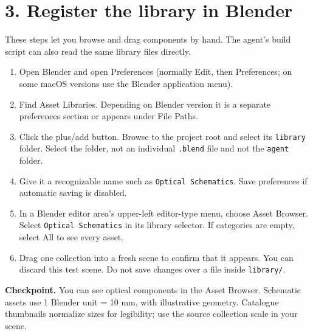\documentclass[11pt,a4paper]{article}
\begin{document}
\section*{3. Register the library in Blender}
These steps let you browse and drag components by hand. The agent's build script can also read the same library files directly.
\begin{enumerate}
\item Open Blender and open Preferences (normally Edit, then Preferences; on some macOS versions use the Blender application menu).
\item Find Asset Libraries. Depending on Blender version it is a separate preferences section or appears under File Paths.
\item Click the plus/add button. Browse to the project root and select its \texttt{library} folder. Select the folder, not an individual \texttt{.blend} file and not the \texttt{agent} folder.
\item Give it a recognizable name such as \texttt{Optical Schematics}. Save preferences if automatic saving is disabled.
\item In a Blender editor area's upper-left editor-type menu, choose Asset Browser. Select \texttt{Optical Schematics} in its library selector. If categories are empty, select All to see every asset.
\item Drag one collection into a fresh scene to confirm that it appears. You can discard this test scene. Do not save changes over a file inside \texttt{library/}.
\end{enumerate}
\textbf{Checkpoint.} You can see optical components in the Asset Browser. Schematic assets use 1 Blender unit = 10 mm, with illustrative geometry. Catalogue thumbnails normalize sizes for legibility; use the source collection scale in your scene.
\end{document}
